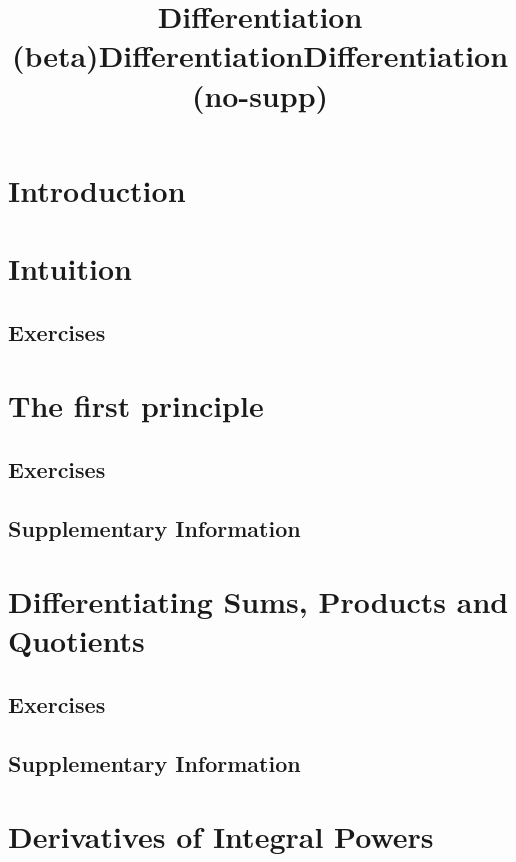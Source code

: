 \documentclass{fts_m2}
\title{Differentiation (beta)}
\title{Differentiation}
\title{Differentiation (no-supp)}
\begin{document}
    \maketitle
    \section*{Introduction}
    
    \tableofcontents

    \section{Intuition}
    
    \subsection*{Exercises}
      
    
    \section{The first principle}
    
    \subsection*{Exercises}
    
    \ifcompilesupp
    \subsection*{Supplementary Information}
    
    \fi

    \section{Differentiating Sums, Products and Quotients}
    
    \subsection*{Exercises}
    
    \ifcompilesupp
    \subsection*{Supplementary Information}
    
    \fi

    \section{Derivatives of Integral Powers}
    
    \ifcompilesupp
\end{document}
